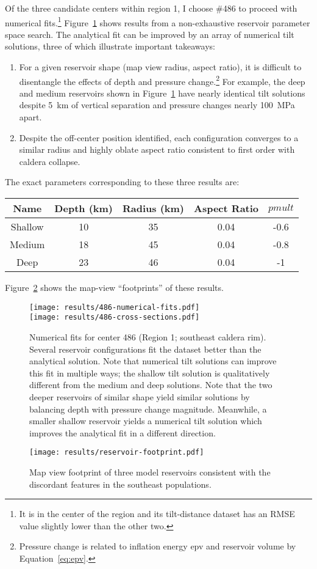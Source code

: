 Of the three candidate centers within region 1, I choose \#486 to proceed with numerical fits.\footnote{It is in the center of the region and its tilt-distance dataset has an \acs{RMSE} value slightly lower than the other two.} Figure~\ref{fig:486-numerical-fits} shows results from a non-exhaustive reservoir parameter space search. The analytical fit can be improved by an array of numerical tilt solutions, three of which illustrate important takeaways:
\begin{enumerate}
    \item For a given reservoir shape (map view radius, aspect ratio), it is difficult to disentangle the effects of depth and pressure change.\footnote{Pressure change is related to inflation energy \acs{epv} and reservoir volume by Equation~\eqref{eq:epv}.} For example, the deep and medium reservoirs shown in Figure~\ref{fig:486-numerical-fits} have nearly identical tilt solutions despite \qty{5}{km} of vertical separation and pressure changes nearly \qty{100}{\mega\Pa} apart. 
    \item Despite the off-center position identified, each configuration converges to a similar radius and highly oblate aspect ratio consistent to first order with caldera collapse.
\end{enumerate}

The exact parameters corresponding to these three results are:
\begin{center}
\begin{tabular}{ccccc}
    Name & Depth (km) & Radius (km) & Aspect Ratio & $pmult$\\
    \hline
    Shallow & 10 & 35 & 0.04 & -0.6\\
    Medium & 18 & 45 & 0.04 & -0.8\\
    Deep & 23 & 46 & 0.04 & -1
\end{tabular}
\end{center}
Figure~\ref{fig:reservoir-footprint} shows the map-view ``footprints'' of these results.

\begin{figure}
    \texttt{[image: results/486-numerical-fits.pdf]}\\
    \texttt{[image: results/486-cross-sections.pdf]}%
    \caption[Numerical parameter fits (center 486)]{Numerical fits for center 486 (Region 1; southeast caldera rim). Several reservoir configurations fit the dataset better than the analytical solution. Note that numerical tilt solutions can improve this fit in multiple ways; the shallow tilt solution is qualitatively different from the medium and deep solutions. Note that the two deeper reservoirs of similar shape yield similar solutions by balancing depth with pressure change magnitude. Meanwhile, a smaller shallow reservoir yields a numerical tilt solution which improves the analytical fit in a different direction.}
    \label{fig:486-numerical-fits}
\end{figure}

\begin{figure}
    \texttt{[image: results/reservoir-footprint.pdf]}
    \caption[Model reservoir footprints]{Map view footprint of three model reservoirs consistent with the discordant features in the southeast populations.}
    \label{fig:reservoir-footprint}
\end{figure}